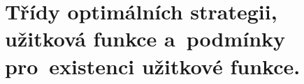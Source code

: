 

\chapter{Třídy optimálních strategii, užitková funkce a~podmínky pro~existenci užitkové funkce.}


















